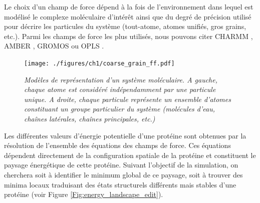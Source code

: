 Le choix d'un champ de force dépend à la fois de l'environnement dans lequel est modélisé le complexe moléculaire d'intérêt ainsi que du degré de précision utilisé pour décrire les particules du système (tout-atome, atomes unifiés, gros grains, etc.). Parmi les champs de force les plus utilisés, nous pouvons citer CHARMM \cite{brooks2009charmm}, AMBER \cite{pearlman1995amber}, GROMOS \cite{oostenbrink2004biomolecular} ou OPLS \cite{jorgensen1996development}.

\begin{figure}
  \centering
  {\texttt{[image: ./figures/ch1/coarse\_grain\_ff.pdf]}}
    \caption[Modèles de représentation d'un système moléculaire tout-atome et gros grain.]{\it Modèles de représentation d'un système moléculaire. A gauche, chaque atome est considéré indépendamment par une particule unique. A droite, chaque particule représente un ensemble d'atomes constituant un groupe particulier du système (molécules d'eau, chaînes latérales, chaînes principales, etc.)}
    \label{Fig:coarse_grain_ff}
  \hspace{0.2cm}
\end{figure}


Les différentes valeurs d'énergie potentielle d'une protéine sont obtenues par la résolution de l'ensemble des équations des champs de force. Ces équations dépendent directement de la configuration spatiale de la protéine et constituent le paysage énergétique de cette protéine. Suivant l’objectif de la simulation, on cherchera soit à identifier le minimum global de ce paysage, soit à trouver des minima locaux traduisant des états structurels différents mais stables d'une protéine (voir Figure \ref{Fig:energy_landscape_edit}).



